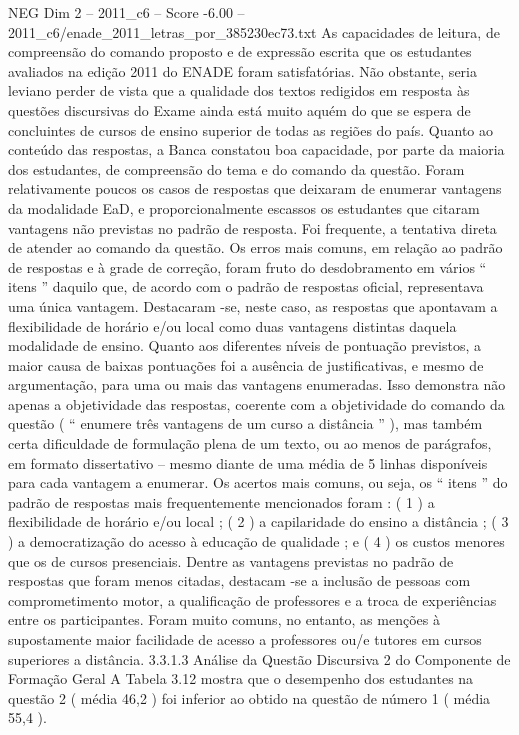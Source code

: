 \begin{textsample}{NEG Dim 2 – 2011\_c6 – Score -6.00 – 2011\_c6/enade\_2011\_letras\_por\_385230ec73.txt}
As capacidades de leitura, de compreensão do comando proposto e de expressão escrita que os estudantes avaliados na edição 2011 do ENADE foram satisfatórias.
Não obstante, seria leviano perder de vista que a qualidade dos textos redigidos em resposta às questões discursivas do Exame ainda está muito aquém do que se espera de concluintes de cursos de ensino superior de todas as regiões do país.
Quanto ao conteúdo das respostas, a Banca constatou boa capacidade, por parte da maioria dos estudantes, de compreensão do tema e do comando da questão.
Foram relativamente poucos os casos de respostas que deixaram de enumerar vantagens da modalidade EaD, e proporcionalmente escassos os estudantes que citaram vantagens não previstas no padrão de resposta.
Foi frequente, a tentativa direta de atender ao comando da questão.
Os erros mais comuns, em relação ao padrão de respostas e à grade de correção, foram fruto do desdobramento em vários “ itens ” daquilo que, de acordo com o padrão de respostas oficial, representava uma única vantagem.
Destacaram -se, neste caso, as respostas que apontavam a flexibilidade de horário e/ou local como duas vantagens distintas daquela modalidade de ensino.
Quanto aos diferentes níveis de pontuação previstos, a maior causa de baixas pontuações foi a ausência de justificativas, e mesmo de argumentação, para uma ou mais das vantagens enumeradas.
Isso demonstra não apenas a objetividade das respostas, coerente com a objetividade do comando da questão ( “ enumere três vantagens de um curso a distância ” ), mas também certa dificuldade de formulação plena de um texto, ou ao menos de parágrafos, em formato dissertativo – mesmo diante de uma média de 5 linhas disponíveis para cada vantagem a enumerar.
Os acertos mais comuns, ou seja, os “ itens ” do padrão de respostas mais frequentemente mencionados foram : ( 1 ) a flexibilidade de horário e/ou local ; ( 2 ) a capilaridade do ensino a distância ; ( 3 ) a democratização do acesso à educação de qualidade ; e ( 4 ) os custos menores que os de cursos presenciais.
Dentre as vantagens previstas no padrão de respostas que foram menos citadas, destacam -se a inclusão de pessoas com comprometimento motor, a qualificação de professores e a troca de experiências entre os participantes.
Foram muito comuns, no entanto, as menções à supostamente maior facilidade de acesso a professores ou/e tutores em cursos superiores a distância. 3.3.1.3 Análise da Questão Discursiva 2 do Componente de Formação Geral A Tabela 3.12 mostra que o desempenho dos estudantes na questão 2 ( média 46,2 ) foi inferior ao obtido na questão de número 1 ( média 55,4 ).

\end{textsample}
